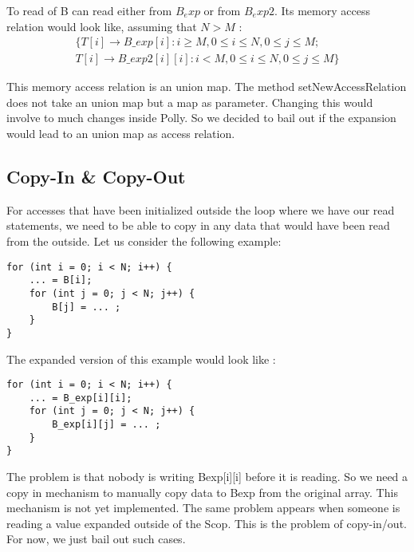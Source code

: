 To read of B can read either from $B_exp$ or from $B_exp2$. Its memory access relation would look like, assuming that $N>M$ :
\begin{gather}
\{ T[i] \rightarrow B\_exp[i] : i \ge M, 0 \le i \le N, 0 \le j \le M ;  \\
T[i] \rightarrow B\_exp2[i][i] : i < M, 0 \le i \le N, 0 \le j \le M \}
\end{gather}

This memory access relation is an union map. The method setNewAccessRelation does not take an union map but a map as parameter. Changing this would involve to much changes inside Polly. So we decided to bail out if the expansion would lead to an union map as access relation.

\subsection{Copy-In & Copy-Out}
For accesses that have been initialized outside the loop where we have our read statements, we need to be able to copy in any data that would have been read from the outside. Let us consider the following example:

\begin{lstlisting}[frame=single]
for (int i = 0; i < N; i++) {
    ... = B[i];
    for (int j = 0; j < N; j++) {
        B[j] = ... ;
    }
}
\end{lstlisting}

The expanded version of this example would look like :

\begin{lstlisting}[frame=single]
for (int i = 0; i < N; i++) {
    ... = B_exp[i][i];
    for (int j = 0; j < N; j++) {
        B_exp[i][j] = ... ;
    }
}

\end{lstlisting}

The problem is that nobody is writing Bexp[i][i] before it is reading. So we need a copy in mechanism to manually copy data to Bexp from the original array. This mechanism is not yet implemented. The same problem appears when someone is reading a value expanded outside of the Scop. This is the problem of copy-in/out. For now, we just bail out such cases.

